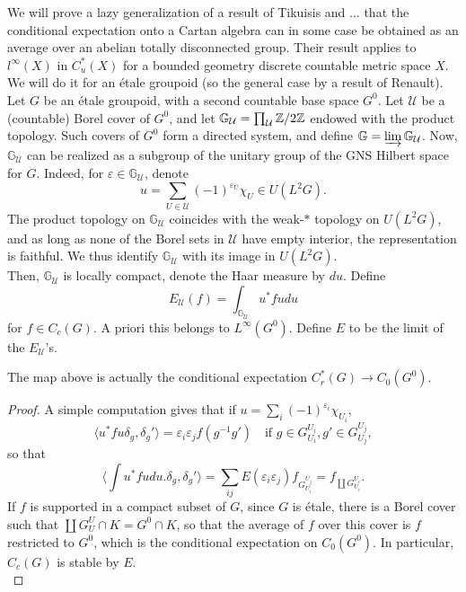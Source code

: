 We will prove a lazy generalization of a result of Tikuisis and ... that the conditional expectation onto a Cartan algebra can in some case be obtained as an average over an abelian totally disconnected group. Their result applies to $l^\infty(X)$ in $C_u^*(X)$ for a bounded geometry discrete countable metric space $X$. We will do it for an \'etale groupoid (so the general case by a result of Renault).\\

Let $G$ be an \'etale groupoid, with a second countable base space $G^0$. Let $\mathcal U$ be a (countable) Borel cover of $G^0$, and let $\mathbb G_{\mathcal U}= \prod_{\mathcal U} \mathbb Z / 2\mathbb Z$ endowed with the product topology. Such covers of $G^0$ form a directed system, and define $\mathbb G = \varinjlim \mathbb G_{\mathcal U}$. Now, $\mathbb G_{\mathcal U}$ can be realized as a subgroup of the unitary group of the GNS Hilbert space for $G$. Indeed, for $\varepsilon \in \mathbb G_{\mathcal U}$, denote 
\[u = \sum_{U\in \mathcal U} (-1)^{\varepsilon_U} \chi_{U} \in U(L^2G).\]
The product topology on $\mathbb G_{\mathcal U}$ coincides with the weak-$*$ topology on $U(L^2G)$, and as long as none of the Borel sets in $\mathcal U$ have empty interior, the representation is faithful. We thus identify $\mathbb G_{\mathcal U}$ with its image in $U(L^2G)$.\\

Then, $\mathbb G_{\mathcal U}$ is locally compact, denote the Haar measure by $du$. Define \[E_{\mathcal U}(f)=\int_{\mathbb G_{\mathcal U}} u^* f u du \] for $f\in C_c(G)$. A priori this belongs to $L^\infty(G^0)$. Define $E$ to be the limit of the $E_{\mathcal U}$'s.

\begin{prop}
The map above is actually the conditional expectation $C_r^*(G)\rightarrow C_0(G^0)$.
\end{prop}   

\begin{proof}
A simple computation gives that if $u =\sum_{i} (-1)^{\varepsilon_i} \chi_{U_i} $, 
\[\langle u^* f u \delta_g , \delta_g'  \rangle =  \varepsilon_i \varepsilon_j f(g^{-1}g')\quad \text{if } g \in  G_{U_i}^{U_i}, g'\in  G_{U_j}^{U_j},\] so that 
\[\langle \int u^* f u du . \delta_g , \delta_g'  \rangle = \sum_{ij}E(\varepsilon_i \varepsilon_j) f_{G_{U_i}^{U_j}} = f_{\coprod G_{U_i}^{U_i}}.\]
If $f$ is supported in a compact subset of $G$, since $G$ is \'etale, there is a Borel cover such that $\coprod G_{U}^U \cap K = G^0 \cap K$, so that the average of $f$ over this cover is $f$ restricted to $G^0$, which is the conditional expectation on $C_0(G^0)$. In particular, $C_c(G)$ is stable by $E$.\\
\end{proof}

